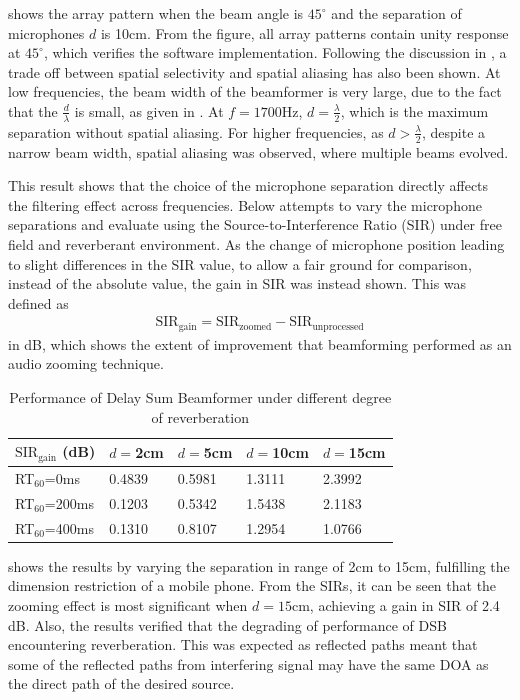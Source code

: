 \documentclass[a4paper,twoside,12pt,hidelinks]{article}
\begin{document}
 shows the array pattern when the beam angle is $45^\circ$ and the separation of microphones $d$ is 10cm. From the figure, all array patterns contain unity response at $45^\circ$, which verifies the software implementation. Following the discussion in , a trade off between spatial selectivity and spatial aliasing has also been shown. At low frequencies, the beam width of the beamformer is very large, due to the fact that the $\frac{d}{\lambda}$ is small, as given in . At $f=1700$Hz, $d=\frac{\lambda}{2}$, which is the maximum separation without spatial aliasing. For higher frequencies, as $d>\frac{\lambda}{2}$, despite a narrow beam width, spatial aliasing was observed, where multiple beams evolved.

This result shows that the choice of the microphone separation directly affects the filtering effect across frequencies. Below attempts to vary the microphone separations and evaluate using the Source-to-Interference Ratio (SIR) under free field and reverberant environment. As the change of microphone position leading to slight differences in the SIR value, to allow a fair ground for comparison, instead of the absolute value, the gain in SIR was instead shown. This was defined as
\begin{align}
\text{SIR}_\text{gain} = \text{SIR}_\text{zoomed}-\text{SIR}_\text{unprocessed} \label{eq:SNRgain}
\end{align}
in dB, which shows the extent of improvement that beamforming performed as an audio zooming technique. 

\begin{table}[H]
\centering
\begin{tabularx}{0.75\textwidth}{|l|Y|Y|Y|Y|}
\hline
$\text{SIR}_\text{gain}$ (dB) & $d=$2cm & $d=$5cm & $d=$10cm & $d=$15cm \\ \hline
RT$_{60}$=0ms & 0.4839 & 0.5981 & 1.3111 & 2.3992 \\ \hline
RT$_{60}$=200ms & 0.1203 & 0.5342 & 1.5438 & 2.1183 \\ \hline
RT$_{60}$=400ms & 0.1310 & 0.8107 & 1.2954 & 1.0766 \\ \hline
\end{tabularx}
\caption{Performance of Delay Sum Beamformer under different degree of reverberation}
\label{table:delaysumperformance}
\end{table}

 shows the results by varying the separation in range of 2cm to 15cm, fulfilling the dimension restriction of a mobile phone. From the SIRs, it can be seen that the zooming effect is most significant when $d=15$cm, achieving a gain in SIR of 2.4 dB. Also, the results verified that the degrading of performance of DSB encountering reverberation. This was expected as reflected paths meant that some of the reflected paths from interfering signal may have the same DOA as the direct path of the desired source.
\end{document}
